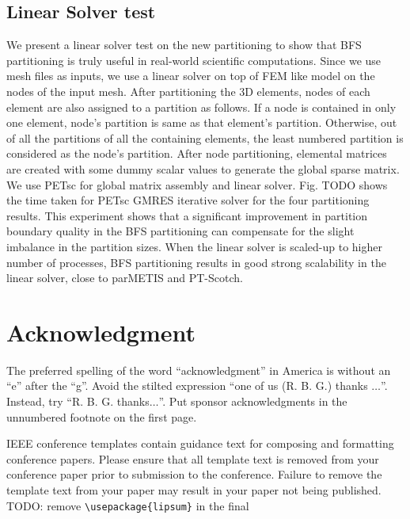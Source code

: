 \documentclass[conference]{IEEEtran}
\begin{document}
\subsection{Linear Solver test}
We present a linear solver test on the new partitioning to show that BFS partitioning is truly useful in real-world scientific computations. Since we use mesh files as inputs, we use a linear solver on top of FEM like model on the nodes of the input mesh. After partitioning the 3D elements, nodes of each element are also assigned to a partition as follows. If a node is contained in only one element, node's partition is same as that element's partition. Otherwise, out of all the partitions of all the containing elements, the least numbered partition is considered as the node's partition. After node partitioning, elemental matrices are created with some dummy scalar values to generate the global sparse matrix. We use PETsc \cite{petsc-web-page} for global matrix assembly and linear solver. Fig. TODO shows the time taken for PETsc GMRES \cite{GMRES} iterative solver for the four partitioning results. This experiment shows that a significant improvement in partition boundary quality in the BFS partitioning can compensate for the slight imbalance in the partition sizes. When the linear solver is scaled-up to higher number of processes, BFS partitioning results in good strong scalability in the linear solver, close to parMETIS and PT-Scotch. 




\section*{Acknowledgment}

The preferred spelling of the word ``acknowledgment'' in America is without 
an ``e'' after the ``g''. Avoid the stilted expression ``one of us (R. B. 
G.) thanks $\ldots$''. Instead, try ``R. B. G. thanks$\ldots$''. Put sponsor 
acknowledgments in the unnumbered footnote on the first page.






\vspace{12pt}
\color{red}
IEEE conference templates contain guidance text for composing and formatting conference papers. Please ensure that all template text is removed from your conference paper prior to submission to the conference. Failure to remove the template text from your paper may result in your paper not being published.
\\
TODO: remove \verb|\usepackage{lipsum}| in the final
\end{document}
